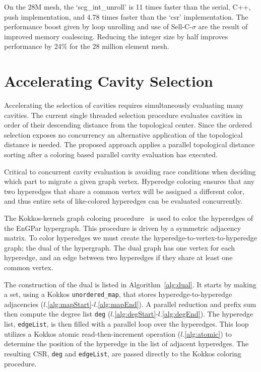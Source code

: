 \documentclass[graybox]{svmult}
\begin{document}
On the 28M mesh, the `scg\_int\_unroll' is 11 times
faster than the serial, C++, push implementation, and 4.78 times faster than
the `csr' implementation.
The performance boost given by loop unrolling and use of Sell-C-$\sigma$ are the
result of improved memory coalescing.
Reducing the integer size by half improves performance by 24\% for the 28
million element mesh.

\section{Accelerating Cavity Selection} \label{sec:select}

Accelerating the selection of cavities requires simultaneously evaluating many
cavities.
The current single threaded selection procedure evaluates cavities in order of
their descending distance from the topological center.
Since the ordered selection exposes no concurrency an alternative application of
the topological distance is needed.
The proposed approach applies a parallel topological distance sorting after a
coloring based parallel cavity evaluation has executed.

Critical to concurrent cavity evaluation is avoiding race conditions when
deciding which part to migrate a given graph vertex.
Hyperedge coloring ensures that any two hyperedges that share a common vertex
will be assigned a different color, and thus entire sets of like-colored
hyperedges can be evaluated concurrently.

The Kokkos-kernels graph coloring procedure~\cite{kokkosColoring}
is used to color the hyperedges of the EnGPar hypergraph.
This procedure is driven by a symmetric adjacency matrix.
To color hyperedges we must create the hyperedge-to-vertex-to-hyperedge
graph; the dual of the hypergraph.
The dual graph has one vertex for each hyperedge, and an edge between two
hyperedges if they share at least one common vertex.

The construction of the dual is listed in Algorithm~\ref{alg:dual}.
It starts by making a set, using a Kokkos \texttt{unordered\_map}, that stores
hyperedge-to-hyperedge adjacencies ($l.$\ref{alg:mapStart}-$l.$\ref{alg:mapEnd}).
A parallel reduction and prefix sum then compute the degree list \verb|deg|
($l.$\ref{alg:degStart}-$l.$\ref{alg:degEnd}).
The hyperedge list, \verb|edgeList|, is then filled with a parallel loop over
the hyperedges.
This loop utilizes a Kokkos atomic read-then-increment operation
($l.$\ref{alg:atomic}) to determine the position of the hyperedge in the list of
adjacent hyperedges.
The resulting CSR, \verb|deg| and \verb|edgeList|, are passed directly to
the Kokkos coloring procedure.
\end{document}
